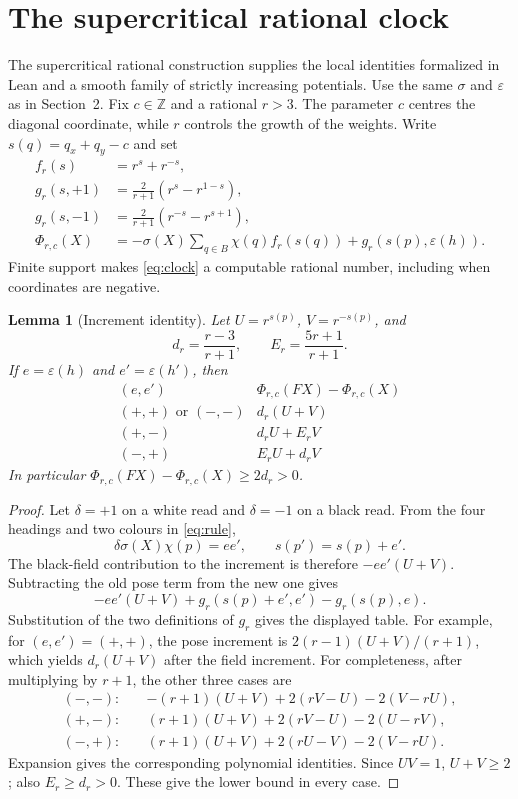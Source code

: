 \documentclass[11pt,a4paper]{article}
\newtheorem{lemma}[theorem]{Lemma}
\theoremstyle{remark}\newtheorem{remark}[theorem]{Remark}
\newcommand{\Z}{\mathbb Z}\newcommand{\N}{\mathbb N}\newcommand{\Q}{\mathbb Q}
\newcommand{\eps}{\varepsilon}\newcommand{\symdiff}{\mathbin{\triangle}}
\begin{document}
\section{The supercritical rational clock}\label{app:rational}
The supercritical rational construction supplies the local identities formalized in
Lean and a smooth family of strictly increasing potentials. Use the same
$\sigma$ and $\eps$ as in Section~2.
Fix $c\in\Z$ and a rational $r>3$. The parameter $c$ centres the diagonal
coordinate, while $r$ controls the growth of the weights. Write
$s(q)=q_x+q_y-c$ and set
\begin{align}
 f_r(s)&=r^s+r^{-s},\\
 g_r(s,+1)&=\frac{2}{r+1}(r^s-r^{1-s}),\\
 g_r(s,-1)&=\frac{2}{r+1}(r^{-s}-r^{s+1}),\\
 \Phi_{r,c}(X)&=-\sigma(X)\sum_{q\in B}\chi(q)f_r(s(q))
                    +g_r(s(p),\eps(h)).\label{eq:clock}
\end{align}
Finite support makes \eqref{eq:clock} a computable rational number, including
when coordinates are negative.

\begin{lemma}[Increment identity]\label{lem:increment}
Let $U=r^{s(p)}$, $V=r^{-s(p)}$, and
\[
 d_r=\frac{r-3}{r+1},\qquad E_r=\frac{5r+1}{r+1}.
\]
If $e=\eps(h)$ and $e'=\eps(h')$, then
\[
\begin{array}{c|c}
 (e,e')&\Phi_{r,c}(FX)-\Phi_{r,c}(X)\\\hline
 (+,+)\text{ or }(-,-)&d_r(U+V)\\
 (+,-)&d_rU+E_rV\\
 (-,+)&E_rU+d_rV
\end{array}
\]
In particular $\Phi_{r,c}(FX)-\Phi_{r,c}(X)\ge2d_r>0$.
\end{lemma}
\begin{proof}
Let $\delta=+1$ on a white read and $\delta=-1$ on a black read. From the
four headings and two colours in \eqref{eq:rule},
\[
 \delta\sigma(X)\chi(p)=ee',\qquad s(p')=s(p)+e'.
\]
The black-field contribution to the increment is therefore
$-ee'(U+V)$. Subtracting the old pose term from the new one gives
\[
 -ee'(U+V)+g_r(s(p)+e',e')-g_r(s(p),e).
\]
Substitution of the two definitions of $g_r$ gives the displayed table.
For example, for $(e,e')=(+,+)$, the pose increment is
$2(r-1)(U+V)/(r+1)$, which yields $d_r(U+V)$ after the field increment.
For completeness, after multiplying by $r+1$, the other three cases are
\begin{align*}
(-,-):\quad&-(r+1)(U+V)+2(rV-U)-2(V-rU),\\
(+,-):\quad& (r+1)(U+V)+2(rV-U)-2(U-rV),\\
(-,+):\quad& (r+1)(U+V)+2(rU-V)-2(V-rU).
\end{align*}
Expansion gives the corresponding polynomial identities. Since $UV=1$, $U+V\ge2$;
also $E_r\ge d_r>0$. These give the lower bound in every case.
\end{proof}
\end{document}
